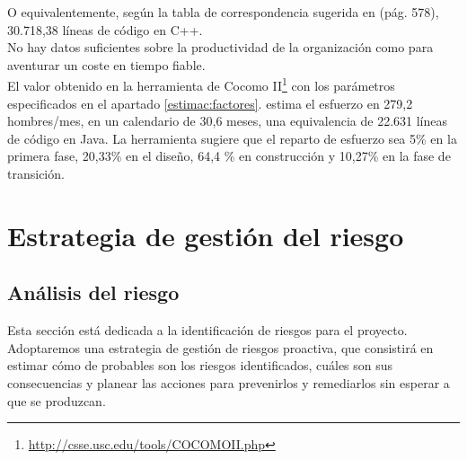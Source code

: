 \documentclass[11pt, a4paper, twoside, titlepage]{article}
\begin{document}
		O equivalentemente, según la tabla de correspondencia sugerida en \cite{PSMAN} (pág. 578), 30.718,38 líneas de código en C++.\\

		No hay datos suficientes sobre la productividad de la organización como para aventurar un coste en tiempo fiable.\\

		El valor obtenido en la herramienta de Cocomo II\footnote{\url{http://csse.usc.edu/tools/COCOMOII.php}} con los parámetros especificados en el apartado \ref{estimac:factores}. estima el esfuerzo en 279,2 hombres/mes, en un calendario de 30,6 meses, una equivalencia de 22.631 líneas de código en Java. La herramienta sugiere que el reparto de esfuerzo sea 5\% en la primera fase, 20,33\% en el diseño, 64,4 \% en construcción y 10,27\% en la fase de transición.
			
	\section{Estrategia de gestión del riesgo}
		\subsection{Análisis del riesgo}
		Esta sección está dedicada a la identificación de riesgos para el proyecto. Adoptaremos una estrategia de gestión de riesgos proactiva, que consistirá en estimar cómo de probables son los riesgos identificados, cuáles son sus consecuencias y planear las acciones para prevenirlos y remediarlos sin esperar a que se produzcan.\\
		
\end{document}
